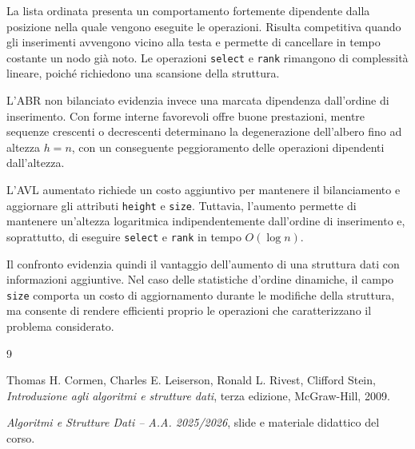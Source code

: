 \documentclass[a4paper,11pt]{article}
\begin{document}
La lista ordinata presenta un comportamento fortemente dipendente dalla posizione nella quale vengono eseguite le operazioni. Risulta competitiva quando gli inserimenti avvengono vicino alla testa e permette di cancellare in tempo costante un nodo già noto. Le operazioni \texttt{select} e \texttt{rank} rimangono di complessità lineare, poiché richiedono una scansione della struttura.

L'ABR non bilanciato evidenzia invece una marcata dipendenza dall'ordine di inserimento. Con forme interne favorevoli offre buone prestazioni, mentre sequenze crescenti o decrescenti determinano la degenerazione dell'albero fino ad altezza $h=n$, con un conseguente peggioramento delle operazioni dipendenti dall'altezza.

L'AVL aumentato richiede un costo aggiuntivo per mantenere il bilanciamento e aggiornare gli attributi \texttt{height} e \texttt{size}. Tuttavia, l'aumento permette di mantenere un'altezza logaritmica indipendentemente dall'ordine di inserimento e, soprattutto,
di eseguire \texttt{select} e \texttt{rank} in tempo $O(\log n)$.

Il confronto evidenzia quindi il vantaggio dell'aumento di una struttura dati con informazioni aggiuntive. Nel caso delle statistiche d'ordine dinamiche, il campo \texttt{size} comporta un costo di aggiornamento durante le modifiche della struttura, ma consente di rendere efficienti proprio le operazioni che caratterizzano il problema considerato.

\clearpage

\renewcommand{\refname}{Bibliografia}

\begin{thebibliography}{9}

Thomas H. Cormen, Charles E. Leiserson, Ronald L. Rivest, Clifford Stein, \textit{Introduzione agli algoritmi e strutture dati}, terza edizione, McGraw-Hill, 2009.

 \textit{Algoritmi e Strutture Dati -- A.A. 2025/2026}, slide e materiale didattico del corso.

\end{thebibliography}
\end{document}
